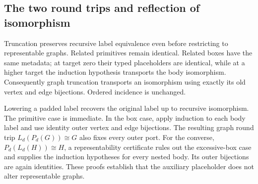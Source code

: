 






\subsection{The two round trips and reflection of isomorphism}

Truncation preserves recursive label equivalence even before restricting
to representable graphs. Related primitives remain identical. Related boxes
have the same metadata; at target zero their typed placeholders are identical,
while at a higher target the induction hypothesis transports the body
isomorphism. Consequently graph truncation transports an isomorphism using
exactly its old vertex and edge bijections. Ordered incidence is unchanged.



Lowering a padded label recovers the original label up to recursive
isomorphism. The primitive case is immediate. In the box case, apply induction
to each body label and use identity outer vertex and edge bijections. The
resulting graph round trip $L_d(P_d(G))\cong G$ also fixes every outer port.
For the converse, $P_d(L_d(H))\cong H$, a representability certificate rules
out the excessive-box case and supplies the induction hypotheses for every
nested body. Its outer bijections are again identities. These proofs establish
that the auxiliary placeholder does not alter representable graphs.




